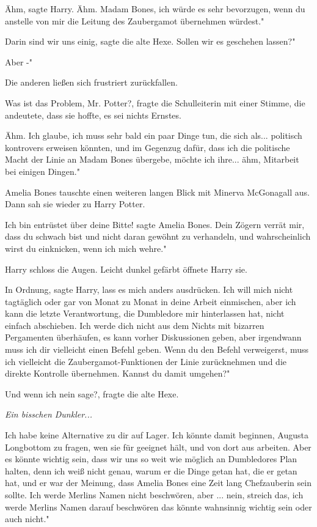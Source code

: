 \glqq Ähm\grqq{}, sagte Harry. \glqq Ähm. Madam Bones, ich würde es sehr
bevorzugen, wenn du anstelle von mir die Leitung des Zaubergamot übernehmen
würdest."

\glqq Darin sind wir uns einig\grqq{}, sagte die alte Hexe. \glqq Sollen wir es
geschehen lassen?"

\glqq Aber -"

Die anderen ließen sich frustriert zurückfallen.

\glqq Was ist das Problem, Mr. Potter?\grqq{}, fragte die Schulleiterin mit
einer Stimme, die andeutete, dass sie hoffte, es sei nichts Ernstes.

\glqq Ähm. Ich glaube, ich muss sehr bald ein paar Dinge tun, die sich als...
politisch kontrovers erweisen könnten, und im Gegenzug dafür, dass ich die
politische Macht der Linie an Madam Bones übergebe, möchte ich ihre... ähm,
Mitarbeit bei einigen Dingen."

Amelia Bones tauschte einen weiteren langen Blick mit Minerva McGonagall aus.
Dann sah sie wieder zu Harry Potter.

\glqq Ich bin entrüstet über deine Bitte!\grqq{} sagte Amelia Bones. \glqq Dein
Zögern verrät mir, dass du schwach bist und nicht daran gewöhnt zu verhandeln,
und wahrscheinlich wirst du einknicken, wenn ich mich wehre."

Harry schloss die Augen. Leicht dunkel gefärbt öffnete Harry sie.

\glqq In Ordnung\grqq{}, sagte Harry, \glqq lass es mich anders ausdrücken. Ich
will mich nicht tagtäglich oder gar von Monat zu Monat in deine Arbeit
einmischen, aber ich kann die letzte Verantwortung, die Dumbledore mir
hinterlassen hat, nicht einfach abschieben. Ich werde dich nicht aus dem Nichts
mit bizarren Pergamenten überhäufen, es kann vorher Diskussionen geben, aber
irgendwann muss ich dir vielleicht einen Befehl geben. Wenn du den Befehl
verweigerst, muss ich vielleicht die Zaubergamot-Funktionen der Linie
zurücknehmen und die direkte Kontrolle übernehmen. Kannst du damit umgehen?"

\glqq Und wenn ich nein sage?\grqq{}, fragte die alte Hexe.

\emph{Ein bisschen Dunkler...}

\glqq Ich habe keine Alternative zu dir auf Lager. Ich könnte damit beginnen,
Augusta Longbottom zu fragen, wen sie für geeignet hält, und von dort aus
arbeiten. Aber es könnte wichtig sein, dass wir uns so weit wie möglich an
Dumbledores Plan halten, denn ich weiß nicht genau, warum er die Dinge getan
hat, die er getan hat, und er war der Meinung, dass Amelia Bones eine Zeit lang
Chefzauberin sein sollte. Ich werde Merlins Namen nicht beschwören, aber ...
nein, streich das, ich werde Merlins Namen darauf beschwören das könnte
wahnsinnig wichtig sein oder auch nicht."

